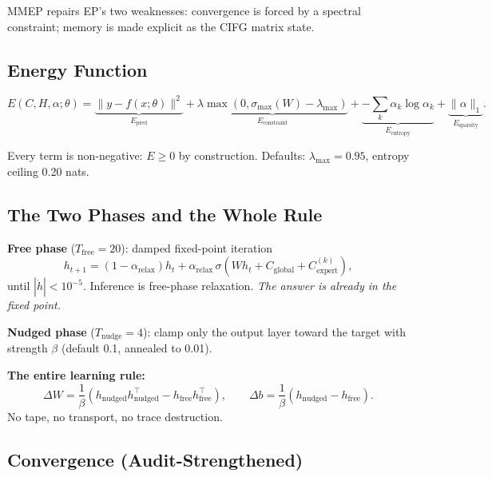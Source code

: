 \documentclass[11pt,letterpaper]{article}
\begin{document}
MMEP repairs EP's two weaknesses: convergence is forced by a spectral
constraint; memory is made explicit as the CIFG matrix state.

\subsection{Energy Function}

\begin{equation}
E(C, H, \alpha;\theta) =
\underbrace{\|y - f(x;\theta)\|^2}_{E_{\text{pred}}}
+ \underbrace{\lambda\max(0,\sigma_{\max}(W) - \lambda_{\max})}_{E_{\text{constraint}}}
+ \underbrace{-\sum_k \alpha_k \log \alpha_k}_{E_{\text{entropy}}}
+ \underbrace{\|\alpha\|_1}_{E_{\text{sparsity}}}.
\end{equation}

Every term is non-negative: $E \geq 0$ by construction.
Defaults: $\lambda_{\max} = 0.95$, entropy ceiling 0.20 nats.

\subsection{The Two Phases and the Whole Rule}

\textbf{Free phase} ($T_{\text{free}} = 20$): damped fixed-point iteration
\[
h_{t+1} = (1-\alpha_{\text{relax}})h_t
+ \alpha_{\text{relax}}\,\sigma\!\left(Wh_t + C_{\text{global}} + C_{\text{expert}}^{(k)}\right),
\]
until $|\dot{h}| < 10^{-5}$.  Inference is free-phase relaxation.
\textit{The answer is already in the fixed point.}

\textbf{Nudged phase} ($T_{\text{nudge}} = 4$): clamp only the output layer
toward the target with strength $\beta$ (default 0.1, annealed to 0.01).

\textbf{The entire learning rule:}
\[
\Delta W = \frac{1}{\beta}\!\left(h_{\text{nudged}} h_{\text{nudged}}^\top
- h_{\text{free}} h_{\text{free}}^\top\right), \qquad
\Delta b = \frac{1}{\beta}\!\left(h_{\text{nudged}} - h_{\text{free}}\right).
\]
No tape, no transport, no trace destruction.

\subsection{Convergence (Audit-Strengthened)}
\end{document}
